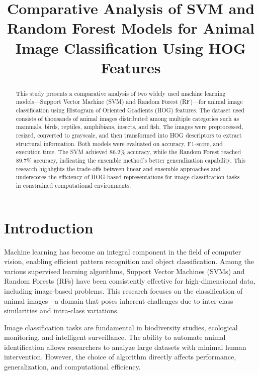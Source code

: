 \documentclass[conference]{IEEEtran}
\begin{document}
\title{Comparative Analysis of SVM and Random Forest Models for Animal Image Classification Using HOG Features}

\author{
}

\maketitle

\begin{abstract}
This study presents a comparative analysis of two widely used machine learning models—Support Vector Machine (SVM) and Random Forest (RF)—for animal image classification using Histogram of Oriented Gradients (HOG) features. The dataset used consists of thousands of animal images distributed among multiple categories such as mammals, birds, reptiles, amphibians, insects, and fish. The images were preprocessed, resized, converted to grayscale, and then transformed into HOG descriptors to extract structural information. Both models were evaluated on accuracy, F1-score, and execution time. The SVM achieved 86.2\% accuracy, while the Random Forest reached 89.7\% accuracy, indicating the ensemble method’s better generalization capability. This research highlights the trade-offs between linear and ensemble approaches and underscores the efficiency of HOG-based representations for image classification tasks in constrained computational environments.
\end{abstract}

\section{Introduction}
Machine learning has become an integral component in the field of computer vision, enabling efficient pattern recognition and object classification. Among the various supervised learning algorithms, Support Vector Machines (SVMs) and Random Forests (RFs) have been consistently effective for high-dimensional data, including image-based problems. This research focuses on the classification of animal images—a domain that poses inherent challenges due to inter-class similarities and intra-class variations.  
\vspace{3pt}

Image classification tasks are fundamental in biodiversity studies, ecological monitoring, and intelligent surveillance. The ability to automate animal identification allows researchers to analyze large datasets with minimal human intervention. However, the choice of algorithm directly affects performance, generalization, and computational efficiency.  
\vspace{3pt}
\end{document}
